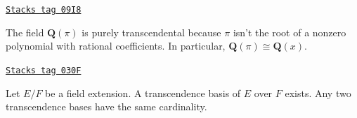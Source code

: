 \begin{example}[Pi transcendental]
\label{fields-example-pi-transcendental}
\href{https://stacks.math.columbia.edu/tag/09I8}{\texttt{Stacks tag 09I8}}

The field $\mathbf{Q}(\pi)$ is purely transcendental because
$\pi$ isn't the root of a nonzero polynomial with rational coefficients.
In particular, $\mathbf{Q}(\pi) \cong \mathbf{Q}(x)$.
\end{example}

\begin{lemma}
\label{fields-lemma-transcendence-degree}
\href{https://stacks.math.columbia.edu/tag/030F}{\texttt{Stacks tag 030F}}

Let $E/F$ be a field extension. A transcendence basis of $E$ over $F$ exists.
Any two transcendence bases have the same cardinality.
\end{lemma}

